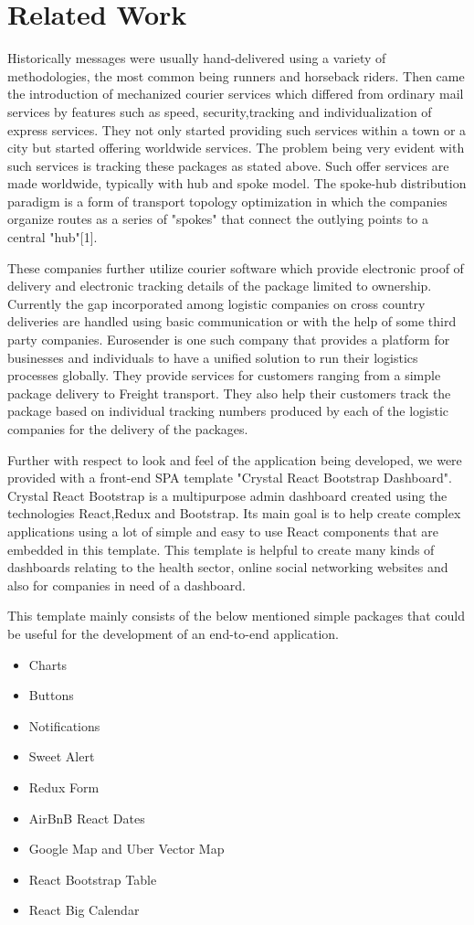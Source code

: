\chapter{Related Work}
\label{cha:relatedwork}

Historically messages were usually hand-delivered using a variety of methodologies, the most common being runners and horseback riders. Then came the introduction of mechanized courier services which differed from ordinary mail services by features such as speed, security,tracking and individualization of express services. They not only started providing such services within a town or a city but started offering worldwide services. The problem being very evident with such services is tracking these packages as stated above. Such offer services are made worldwide, typically with hub and spoke model. The spoke-hub distribution paradigm is a form of transport topology optimization in which the companies organize routes as a series of "spokes" that connect the outlying points to a central "hub"[1].

These companies further utilize courier software which provide electronic proof of delivery and electronic tracking details of the package limited to ownership. Currently the gap incorporated among logistic companies on cross country deliveries are handled using basic communication or with the help of some third party companies. Eurosender is one such  company that provides a platform for businesses and individuals to have a unified solution to run their logistics processes globally. They provide services for customers ranging from a simple package delivery to Freight transport. They also help their customers track the package based on individual  tracking numbers produced by each of the logistic companies for the delivery of the packages.

Further with respect to look and feel of the application being developed, we were provided with a front-end SPA template "Crystal React Bootstrap Dashboard". Crystal React Bootstrap is a multipurpose admin dashboard created using the technologies React,Redux and Bootstrap. Its main goal is to help create complex applications using a lot of simple and easy to use React components that are embedded in this template. This template is helpful to create many kinds of dashboards relating to the health sector, online social networking websites and also for companies in need of a dashboard.

This template mainly consists of the below mentioned simple packages that could be useful for the development of an end-to-end application.

\begin{itemize}
\item Charts
\item Buttons
\item Notifications
\item Sweet Alert
\item Redux Form
\item AirBnB React Dates
\item Google Map and Uber Vector Map
\item React Bootstrap Table
\item React Big Calendar
\end{itemize}
